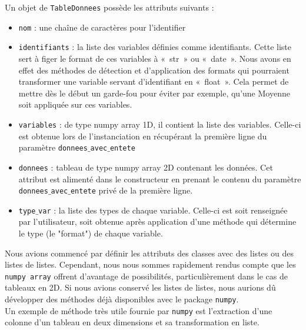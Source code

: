 \documentclass[11pt]{article}
\begin{document}
Un objet de \texttt{TableDonnees} possède les attributs suivants :
\begin{itemize}
    \item \texttt{nom} : une chaîne de caractères pour l'identifier 
    \item \texttt{identifiants} : la liste des variables définies comme identifiants. Cette liste sert à figer le format de ces variables à «~str~» ou «~date~». Nous avons en effet des méthodes de détection et d'application des formats qui pourraient transformer une variable servant d'identifiant en «~float~». Cela permet de mettre dès le début un garde-fou pour éviter par exemple, qu'une Moyenne soit appliquée sur ces variables.
    \item \texttt{variables} : de type numpy array 1D, il contient la liste des variables. Celle-ci est obtenue lors de l'instanciation en récupérant la première ligne du paramètre \texttt{donnees$\_$avec$\_$entete}
    \item \texttt{donnees} : tableau de type numpy array 2D contenant les données. Cet attribut est alimenté dans le constructeur en prenant le contenu du paramètre \texttt{donnees$\_$avec$\_$entete} privé de la première ligne.
    \item \texttt{type$\_$var} : la liste des types de chaque variable. Celle-ci est soit renseignée par l'utilisateur, soit obtenue après application d'une méthode qui détermine le type (le "format") de chaque variable.
\end{itemize}

\bigbreak

\begin{tcolorbox}[colback=gray!5!white,
                  colframe=gray!75!black,
                  title= Le choix du recours au package \texttt{numpy}]
Nous avions commencé par définir les attributs des classes avec des listes ou des listes de listes. Cependant, nous nous sommes rapidement rendus compte que les \texttt{numpy array} offrent d'avantage de possibilités, particulièrement dans le cas de tableaux en 2D. Si nous avions conservé les listes de listes, nous aurions dû développer des méthodes déjà disponibles avec le package \texttt{numpy}.\\ Un exemple de méthode très utile fournie par \texttt{numpy} est l'extraction d'une colonne d'un tableau en deux dimensions et sa transformation en liste.
\end{tcolorbox}
\end{document}
